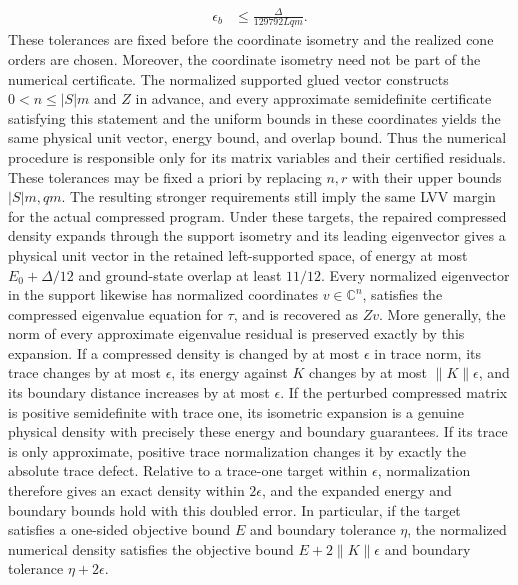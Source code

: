 \begin{lemma}
\begin{align*}
        \epsilon_b & \le \frac{\Delta}{129792Lqm}.
    \end{align*}
    These tolerances are fixed before the coordinate isometry and the
    realized cone orders are chosen.
    Moreover, the coordinate isometry need not be part of the numerical
    certificate.  The normalized supported glued vector constructs
    $0<n\le |S|m$ and $Z$ in advance, and every approximate semidefinite
    certificate satisfying this statement and the uniform bounds in these
    coordinates yields
    the same physical unit vector, energy bound, and overlap bound.  Thus the
    numerical procedure is responsible only for its matrix variables and
    their certified residuals.
    These tolerances may be fixed a priori by replacing $n,r$ with their
    upper bounds $|S|m,qm$.  The resulting stronger requirements still imply
    the same LVV margin for the actual compressed program.
    Under these targets, the repaired compressed density expands through the
    support isometry and its leading eigenvector gives a physical unit vector
    in the retained left-supported space, of energy at most
    $E_0+\Delta/12$ and ground-state overlap at least $11/12$.
    Every normalized eigenvector in the
    support likewise has normalized coordinates $v\in\mathbb C^n$, satisfies
    the compressed eigenvalue equation for $\tau$, and is recovered as $Zv$.
    More generally, the norm of every approximate eigenvalue residual is
    preserved exactly by this expansion.  If a compressed density is changed
    by at most $\epsilon$ in trace norm, its trace changes by at most
    $\epsilon$, its energy against $K$ changes by at most
    $\lVert K\rVert\epsilon$, and its boundary distance increases by at most
    $\epsilon$.  If the perturbed compressed matrix is positive semidefinite
    with trace one, its isometric expansion is a genuine physical density
    with precisely these energy and boundary guarantees.  If its trace is
    only approximate, positive trace normalization changes it by exactly the
    absolute trace defect.  Relative to a trace-one target within
    $\epsilon$, normalization therefore gives an exact density within
    $2\epsilon$, and the expanded energy and boundary bounds hold with this
    doubled error.  In particular, if the target satisfies a one-sided
    objective bound $E$ and boundary tolerance $\eta$, the normalized
    numerical density satisfies the objective bound
    $E+2\lVert K\rVert\epsilon$ and boundary tolerance $\eta+2\epsilon$.
\end{lemma}
